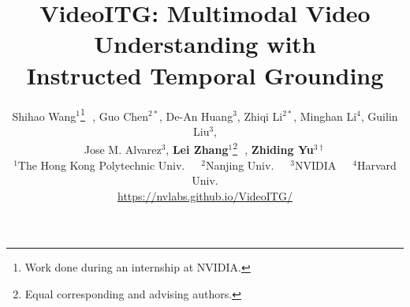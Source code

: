 \documentclass[10pt,twocolumn,letterpaper]{article}
\title{VideoITG: Multimodal Video Understanding with \\ Instructed Temporal Grounding}
\author{
Shihao Wang$^{1}$\thanks{Work done during an internship at NVIDIA.}~\,,
Guo Chen$^{2*}$,
De-An Huang$^3$,
Zhiqi Li$^{2*}$,
Minghan Li$^4$,
Guilin Liu$^3$,\\
Jose M. Alvarez$^3$,
\textbf{Lei Zhang}$^1$\thanks{Equal corresponding and advising authors.}~\,,
\textbf{Zhiding Yu}$^{3\dagger}$\\[0.25cm]
$^1$The Hong Kong Polytechnic Univ.~~~$^2$Nanjing Univ.~~~$^3$NVIDIA~~~$^4$Harvard Univ.\\
\href{https://nvlabs.github.io/VideoITG/}{https://nvlabs.github.io/VideoITG/}
}
\begin{document}
\maketitle








{
    \small
    
    
}

\appendix

\end{document}
